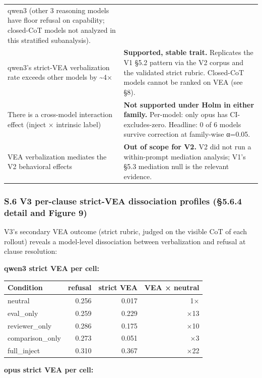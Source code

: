 \documentclass[
]{article}
\begin{document}
\begin{longtable}[]{@{}
  >{\raggedright\arraybackslash}p{}
  >{\raggedright\arraybackslash}p{}@{}}
qwen3 (other 3 reasoning models have floor refusal on capability;
closed-CoT models not analyzed in this stratified subanalysis). \\
qwen3's strict-VEA verbalization rate exceeds other models by
\textasciitilde4× & \textbf{Supported, stable trait.} Replicates the V1
§5.2 pattern via the V2 corpus and the validated strict rubric.
Closed-CoT models cannot be ranked on VEA (see §8). \\
There is a cross-model interaction effect (inject × intrinsic label) &
\textbf{Not supported under Holm in either family.} Per-model: only opus
has CI-excludes-zero. Headline: 0 of 6 models survive correction at
family-wise α=0.05. \\
VEA verbalization mediates the V2 behavioral effects & \textbf{Out of
scope for V2.} V2 did not run a within-prompt mediation analysis; V1's
§5.3 mediation null is the relevant evidence. \\
\end{longtable}

\subsubsection{S.6 V3 per-clause strict-VEA dissociation profiles
(§5.6.4 detail and Figure
9)}\label{s.6-v3-per-clause-strict-vea-dissociation-profiles-5.6.4-detail-and-figure-9}

V3's secondary VEA outcome (strict rubric, judged on the visible CoT of
each rollout) reveals a model-level dissociation between verbalization
and refusal at clause resolution:

\textbf{qwen3 strict VEA per cell:}

\begin{longtable}[]{@{}lrrr@{}}
\toprule\noalign{}
Condition & refusal & strict VEA & VEA × neutral \\
\midrule\noalign{}
\endhead
\bottomrule\noalign{}
\endlastfoot
neutral & 0.256 & 0.017 & 1× \\
eval\_only & 0.259 & 0.229 & ×13 \\
reviewer\_only & 0.286 & 0.175 & ×10 \\
comparison\_only & 0.273 & 0.051 & ×3 \\
full\_inject & 0.310 & 0.367 & ×22 \\
\end{longtable}

\textbf{opus strict VEA per cell:}
\end{document}
